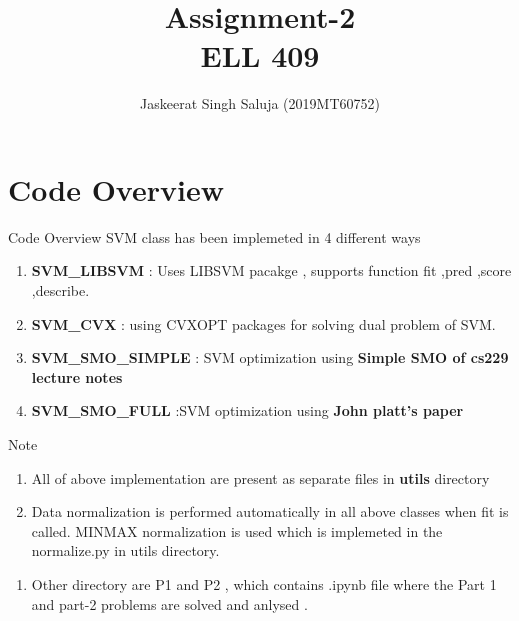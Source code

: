 \documentclass[12pt,t]{beamer}
\author{Jaskeerat Singh Saluja (2019MT60752)}
\title{Assignment-2 \\ ELL 409}
\begin{document}
\begin{frame}[t]
\titlepage
\end{frame}



\section{Code Overview}


\begin{frame}[t]{Code Overview}
    \scriptsize
    SVM class has been implemeted in 4 different ways
    \begin{enumerate}
        \item \textbf{SVM\_LIBSVM }: Uses LIBSVM pacakge , supports function fit ,pred ,score ,describe.
        \item \textbf{SVM\_CVX} : using CVXOPT packages for solving dual problem of SVM.
        \item \textbf{SVM\_SMO\_SIMPLE} : SVM optimization using \textbf{Simple SMO of cs229 lecture notes}
        \item \textbf{SVM\_SMO\_FULL} :SVM optimization using \textbf{John platt's paper}
    \end{enumerate}
    
    \begin{block}{Note}
        \begin{enumerate}
            \item   All of above implementation are present as separate files in \textbf{utils} directory

            \item  Data normalization is performed automatically in all above classes when fit is called. MINMAX normalization is used 
                which is implemeted in the normalize.py in utils directory.

        \end{enumerate}
    \end{block}
    \begin{enumerate}
        \item Other directory are P1 and P2 , which contains .ipynb file where the Part 1 and 
            part-2 problems are solved and anlysed .
    \end{enumerate}

   
\end{frame}
\end{document}
